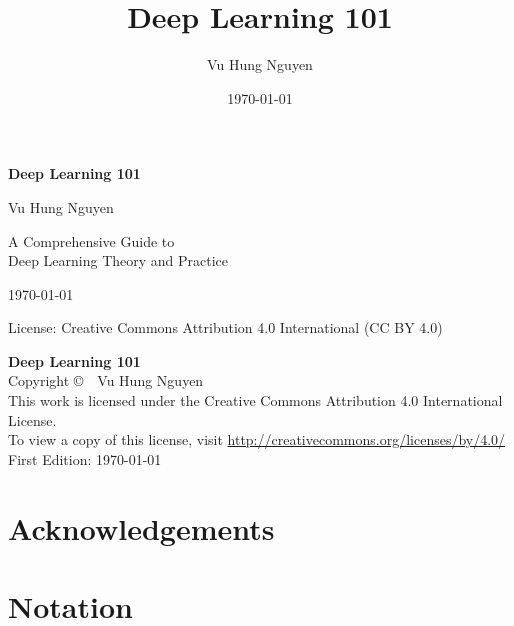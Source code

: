 \documentclass[10pt,a5paper,twoside,openright]{book}
\title{\textbf{Deep Learning 101}}
\author{Vu Hung Nguyen}
\date{\today}
\theoremstyle{definition}
\theoremstyle{remark}
\begin{document}
\frontmatter

\begin{titlepage}
    \centering
    \vspace*{2cm}
    
    {\Huge\bfseries Deep Learning 101\par}
    \vspace{1.5cm}
    
    {\Large Vu Hung Nguyen\par}
    \vspace{2cm}
    
    {\large A Comprehensive Guide to\\
    Deep Learning Theory and Practice\par}
    
    \vfill
    
    {\large \today\par}
    \vspace{0.5cm}
    
    {\small License: Creative Commons Attribution 4.0 International (CC BY 4.0)\par}
\end{titlepage}

\newpage
\thispagestyle{empty}
\vspace*{\fill}
\begin{flushleft}
\textbf{Deep Learning 101}\\
Copyright \copyright~\the\year~Vu Hung Nguyen\\[0.5em]
This work is licensed under the Creative Commons Attribution 4.0 International License.\\
To view a copy of this license, visit \url{http://creativecommons.org/licenses/by/4.0/}\\[0.5em]
First Edition: \today
\end{flushleft}
\vspace*{\fill}
\clearpage

\tableofcontents

\chapter*{Acknowledgements}


\chapter*{Notation}

\end{document}
